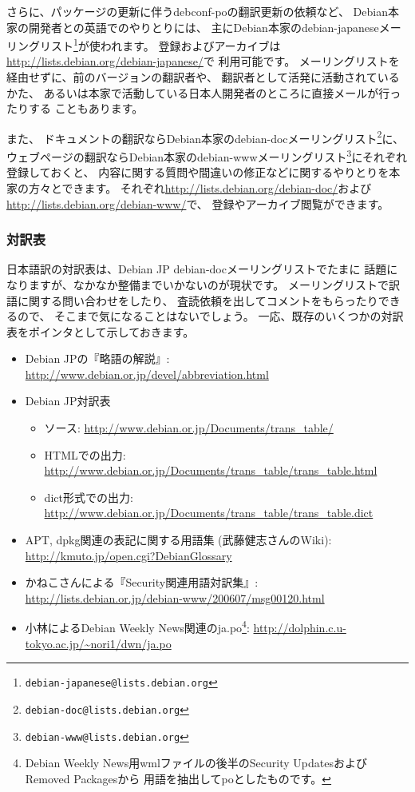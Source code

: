 \documentclass[mingoth,a4paper]{jsarticle}
\begin{document}
さらに、パッケージの更新に伴うdebconf-poの翻訳更新の依頼など、
Debian本家の開発者との英語でのやりとりには、
主にDebian本家のdebian-japaneseメーリングリスト\footnote{%
\texttt{debian-japanese@lists.debian.org}}が使われます。
登録およびアーカイブは\url{http://lists.debian.org/debian-japanese/}で
利用可能です。
メーリングリストを経由せずに、前のバージョンの翻訳者や、
翻訳者として活発に活動されているかた、
あるいは本家で活動している日本人開発者のところに直接メールが行ったりする
こともあります。

また、
ドキュメントの翻訳ならDebian本家のdebian-docメーリングリスト\footnote{%
\texttt{debian-doc@lists.debian.org}}に、
ウェブページの翻訳ならDebian本家のdebian-wwwメーリングリスト\footnote{%
\texttt{debian-www@lists.debian.org}}にそれぞれ登録しておくと、
内容に関する質問や間違いの修正などに関するやりとりを本家の方々とできます。
それぞれ\url{http://lists.debian.org/debian-doc/}および
\url{http://lists.debian.org/debian-www/}で、
登録やアーカイブ閲覧ができます。

\subsubsection{対訳表}

日本語訳の対訳表は、Debian JP debian-docメーリングリストでたまに
話題になりますが、なかなか整備までいかないのが現状です。
メーリングリストで訳語に関する問い合わせをしたり、
査読依頼を出してコメントをもらったりできるので、
そこまで気になることはないでしょう。
一応、既存のいくつかの対訳表をポインタとして示しておきます。
\begin{itemize}
 \item Debian JPの『略語の解説』:
       \url{http://www.debian.or.jp/devel/abbreviation.html}
 \item Debian JP対訳表
       \begin{itemize}
	\item ソース: \url{http://www.debian.or.jp/Documents/trans_table/}
	\item HTMLでの出力:
	      \url{http://www.debian.or.jp/Documents/trans_table/trans_table.html}
	\item dict形式での出力:
	      \url{http://www.debian.or.jp/Documents/trans_table/trans_table.dict}
       \end{itemize}
 \item APT, dpkg関連の表記に関する用語集 (武藤健志さんのWiki):
       \url{http://kmuto.jp/open.cgi?DebianGlossary}
 \item かねこさんによる『Security関連用語対訳集』:
       \url{http://lists.debian.or.jp/debian-www/200607/msg00120.html}
 \item 小林によるDebian Weekly News関連のja.po\footnote{Debian Weekly
       News用wmlファイルの後半のSecurity UpdatesおよびRemoved Packagesから
       用語を抽出してpoとしたものです。}:
       \url{http://dolphin.c.u-tokyo.ac.jp/~nori1/dwn/ja.po}
\end{itemize}
\end{document}
